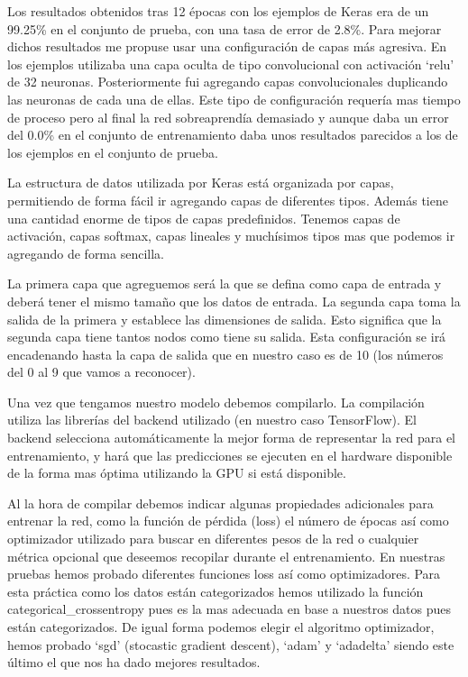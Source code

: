 \bigskip
Los resultados obtenidos tras 12 épocas con los ejemplos de Keras era de un 99.25\% en el conjunto de prueba, con una tasa de error de 2.8\%. Para mejorar dichos resultados me propuse usar una configuración de capas más agresiva. En los ejemplos utilizaba una capa oculta de tipo convolucional con activación `relu' de 32 neuronas. Posteriormente fui agregando capas convolucionales duplicando las neuronas de cada una de ellas. Este tipo de configuración requería mas tiempo de proceso pero al final la red sobreaprendía demasiado y aunque daba un error del 0.0\% en el conjunto de entrenamiento daba unos resultados parecidos a los de los ejemplos en el conjunto de prueba.

\bigskip
La estructura de datos utilizada por Keras está organizada por capas, permitiendo de forma fácil ir agregando capas de diferentes tipos. Además tiene una cantidad enorme de tipos de capas predefinidos. Tenemos capas de activación, capas softmax, capas lineales y muchísimos tipos mas que podemos ir agregando de forma sencilla.
 
\bigskip
La primera capa que agreguemos será la que se defina como capa de entrada y deberá tener el mismo tamaño que los datos de entrada. La segunda capa toma la salida de la primera y establece las dimensiones de salida. Esto significa que la segunda capa tiene tantos nodos como tiene su salida. Esta configuración se irá encadenando hasta la capa de salida que en nuestro caso es de 10 (los números del 0 al 9 que vamos a reconocer).

\bigskip
Una vez que tengamos nuestro modelo debemos compilarlo. La compilación utiliza las librerías del backend utilizado (en nuestro caso TensorFlow). El backend selecciona automáticamente la mejor forma de representar la red para el entrenamiento, y hará que las predicciones se ejecuten en el hardware disponible de la forma mas óptima utilizando la GPU si está disponible.

\bigskip
Al la hora de compilar debemos indicar algunas propiedades adicionales para entrenar la red, como la función de pérdida (loss) el número de épocas así como optimizador utilizado para buscar en diferentes pesos de la red o cualquier métrica opcional que deseemos recopilar durante el entrenamiento. En nuestras pruebas hemos probado diferentes funciones loss así como optimizadores. Para esta práctica como los datos están categorizados hemos utilizado la función categorical\_crossentropy pues es la mas adecuada en base a nuestros datos pues  están categorizados. De igual forma podemos elegir el algoritmo optimizador, hemos probado `sgd' (stocastic gradient descent), `adam' y `adadelta' siendo este último el que nos ha dado mejores resultados. 



